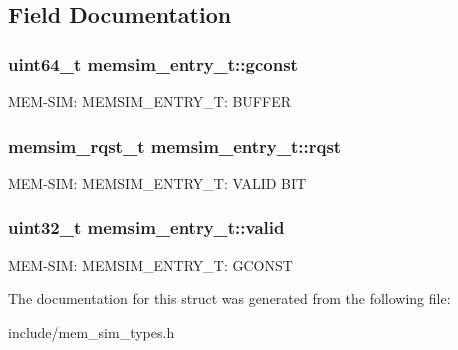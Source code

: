 \subsection{Field Documentation}
\hypertarget{structmemsim__entry__t_a5e6fc38a3aa83e0c1ec7fcf9e1cf2563}{
\subsubsection[{gconst}]{\setlength{\rightskip}{0pt plus 5cm}uint64\-\_\-t memsim\-\_\-entry\-\_\-t\-::gconst}}\label{structmemsim__entry__t_a5e6fc38a3aa83e0c1ec7fcf9e1cf2563}
M\-E\-M-\/\-S\-I\-M\-: M\-E\-M\-S\-I\-M\-\_\-\-E\-N\-T\-R\-Y\-\_\-\-T\-: B\-U\-F\-F\-E\-R \hypertarget{structmemsim__entry__t_a0bd6994a034a78c0d2b8d2adfc0cf2bd}{
\subsubsection[{rqst}]{\setlength{\rightskip}{0pt plus 5cm}memsim\-\_\-rqst\-\_\-t memsim\-\_\-entry\-\_\-t\-::rqst}}\label{structmemsim__entry__t_a0bd6994a034a78c0d2b8d2adfc0cf2bd}
M\-E\-M-\/\-S\-I\-M\-: M\-E\-M\-S\-I\-M\-\_\-\-E\-N\-T\-R\-Y\-\_\-\-T\-: V\-A\-L\-I\-D B\-I\-T \hypertarget{structmemsim__entry__t_a0c0fd08ced6d9c59b1c2806186ac6dc2}{
\subsubsection[{valid}]{\setlength{\rightskip}{0pt plus 5cm}uint32\-\_\-t memsim\-\_\-entry\-\_\-t\-::valid}}\label{structmemsim__entry__t_a0c0fd08ced6d9c59b1c2806186ac6dc2}
M\-E\-M-\/\-S\-I\-M\-: M\-E\-M\-S\-I\-M\-\_\-\-E\-N\-T\-R\-Y\-\_\-\-T\-: G\-C\-O\-N\-S\-T 

The documentation for this struct was generated from the following file\-:\begin{DoxyCompactItemize}
\item 
include/mem\-\_\-sim\-\_\-types.\-h\end{DoxyCompactItemize}
